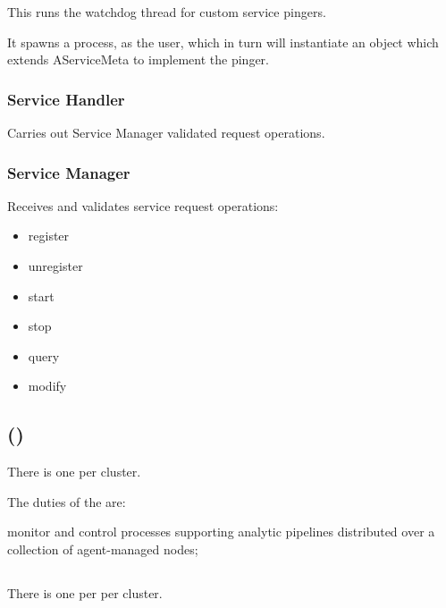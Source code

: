 \begin{itemize}
    This runs the watchdog thread for custom service pingers.
 
    It spawns a process, as the user, which in turn will instantiate an object which extends
    AServiceMeta to implement the pinger.

    \subsubsection{Service Handler} 
    
    Carries out Service Manager validated request operations.
            
    \subsubsection{Service Manager} 
    
    Receives and validates service request operations:
    
    \begin{itemize}
      \item register
      \item unregister
      \item start
      \item stop
      \item query
      \item modify
    \end{itemize}
  
    \subsection{\varProcessManager (\varPM)}    
    
    There is one \varProcessManager per \varDUCC cluster.
    
    The duties of the \varProcessManager are:
    
    \begin{description}
      \item monitor and control processes supporting analytic pipelines distributed over a collection of agent-managed nodes;
    \end{description}
    
    \subsection{\varAgent}  

    There is one \varAgent per \varNodeMachineComputer per \varDUCC cluster.
    

\end{itemize}
